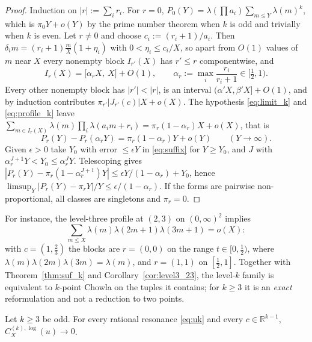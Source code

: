 \begin{proof}
Induction on $|r|:=\sum_ir_i$. For $r=0$, $P_0(Y)=\lambda(\prod a_i)\sum_{m\le Y}\lambda(m)^k$, which is $\pi_0Y+o(Y)$ by the prime number theorem when $k$ is odd and trivially when $k$ is even. Let $r\ne0$ and choose $c_i:=(r_i+1)/a_i$. Then $\delta_im=(r_i+1)\frac mX(1+\eta_i)$ with $0<\eta_i\le c_i/X$, so apart from $O(1)$ values of $m$ near $X$ every nonempty block $I_{r'}(X)$ has $r'\le r$ componentwise, and
\begin{equation}
I_r(X)=\bigl[\alpha_rX,\ X\bigr]+O(1),\qquad \alpha_r:=\max_i\frac{r_i}{r_i+1}\in\bigl[\tfrac12,1\bigr).
\label{eq:last_block}
\end{equation}
Every other nonempty block has $|r'|<|r|$, is an interval $(\alpha'X,\beta'X]+O(1)$, and by induction contributes $\pi_{r'}|J_{r'}(c)|X+o(X)$. The hypothesis \eqref{eq:limit_k} and \eqref{eq:profile_k} leave $\sum_{m\in I_r(X)}\lambda(m)\prod_i\lambda(a_im+r_i)=\pi_r(1-\alpha_r)X+o(X)$, that is
\begin{equation}
P_r(Y)-P_r(\alpha_rY)=\pi_r(1-\alpha_r)Y+o(Y)\qquad(Y\to\infty).
\label{eq:suffix}
\end{equation}
Given $\epsilon>0$ take $Y_0$ with error $\le\epsilon Y$ in \eqref{eq:suffix} for $Y\ge Y_0$, and $J$ with $\alpha_r^{J+1}Y<Y_0\le\alpha_r^JY$. Telescoping gives $|P_r(Y)-\pi_r(1-\alpha_r^{J+1})Y|\le\epsilon Y/(1-\alpha_r)+Y_0$, hence $\limsup_Y|P_r(Y)-\pi_rY|/Y\le\epsilon/(1-\alpha_r)$. If the forms are pairwise non-proportional, all classes are singletons and $\pi_r=0$.
\end{proof}

For instance, the level-three profile at $(2,3)$ on $(0,\infty)^2$ implies
\begin{equation}
\sum_{m\le X}\lambda(m)\lambda(2m+1)\lambda(3m+1)=o(X):
\label{eq:231}
\end{equation}
with $c=(1,\tfrac23)$ the blocks are $r=(0,0)$ on the range $t\in[0,\tfrac12)$, where $\lambda(m)\lambda(2m)\lambda(3m)=\lambda(m)$, and $r=(1,1)$ on $[\tfrac12,1]$. Together with Theorem~\ref{thm:suf_k} and Corollary~\ref{cor:level3_23}, the level-$k$ family is equivalent to $k$-point Chowla on the tuples it contains; for $k\ge3$ it is an \emph{exact} reformulation and not a reduction to two points.

\begin{theorem}
\label{thm:log_k}
Let $k\ge3$ be odd. For every rational resonance \eqref{eq:uk} and every $c\in\mathbb R^{k-1}$, $C^{(k),\log}_X(u)\to0$.
\end{theorem}

